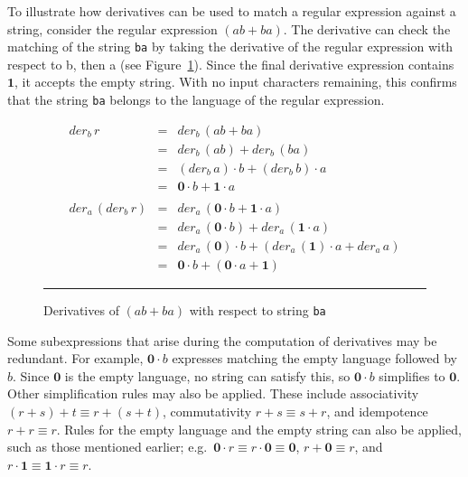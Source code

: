 \documentclass[12pt]{article}
\newcommand{\ZERO}{\textbf{0}}
\newcommand{\ONE}{\textbf{1}}
\newcommand{\der}{\textit{der}}
\begin{document}
To illustrate how derivatives can be used to match a regular expression against a string, consider the regular expression $( ab + ba )$. 
The derivative can check the matching of the string \texttt{ba} by taking the derivative of the regular expression with respect to b,
then a (see Figure~\ref{derivative}). Since the final derivative expression contains $\ONE$, it accepts the empty string. With no input
characters remaining, this confirms that the string \texttt{ba} belongs to the language of the
regular expression.


\begin{figure}[ht]
\[
\begin{array}{rcl}
\der_b\, r           & =           &  \der_b\, (ab + ba) \\
                     & =           & \der_b\, (ab) + \der_b\, (ba) \\
                     & =           & (\der_b\, a) \cdot b + (\der_b\, b) \cdot a  \\
                     & =           & \ZERO \cdot b + \ONE \cdot a \\\\

\der_a\, (\der_b\, r) & =           & \der_a\, (\ZERO \cdot b + \ONE \cdot a)\\
                      & =           & \der_a\, (\ZERO \cdot b) + \der_a\, (\ONE \cdot a)\\
                      & =           & \der_a\, (\ZERO) \cdot b + (\der_a\, (\ONE) \cdot a + \der_a\, a)\\
                      & =           & \ZERO \cdot b + (\ZERO \cdot a + \ONE )
\end{array}
\]
    \mbox{}
    \hrule
\caption{Derivatives of $(ab+ba)$ with respect to string \texttt{ba}}\label{derivative}
\end{figure}

Some subexpressions that arise during the computation of derivatives may be
redundant. For example, $\ZERO \cdot b$ expresses matching the empty language
followed by $b$. Since $\ZERO$ is the empty language, no string can satisfy
this, so $\ZERO \cdot b$ simplifies to $\ZERO$. Other simplification rules may also be applied. These include associativity
$(r+s)+t \equiv r+(s+t)$, commutativity $r+s \equiv s+r$, and idempotence
$r+r \equiv r$. Rules for the empty language and the empty string can also be
applied, such as those mentioned earlier; e.g.\ $\ZERO \cdot r \equiv r \cdot
\ZERO \equiv \ZERO$, $r+\ZERO \equiv r$, and $r \cdot \ONE \equiv \ONE \cdot r
\equiv r$.  
\end{document}
